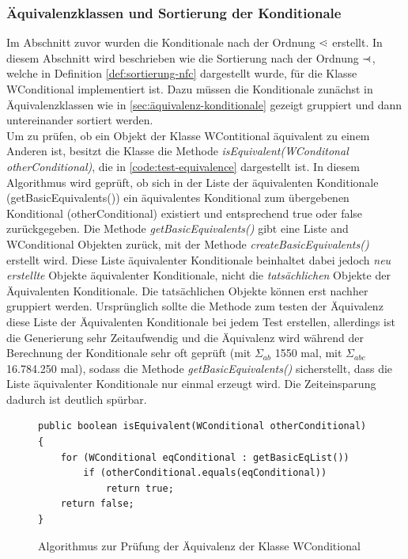 \documentclass[12pt,a4paper]{article}
\newcommand\dotl{\mathrel{%
    \mathchoice{\QEQ}{\QEQ}{\QEQ}{\QEQ}%
}}
\def\QEQ{{%
    \setbox0\hbox{<}%
    \rlap{\hbox to \wd0{\hss \raisebox {0.1pt}{$\ \cdot$\hss}}}\box0
}}
\newcommand\rdotl{\mathrel{%
    \mathchoice{\RQEQ}{\RQEQ}{\RQEQ}{\RQEQ}%
}}
\def\RQEQ{{%
    \setbox0\hbox{$\prec$}%
    \rlap{\hbox to \wd0{\hss \raisebox {0.01pt}{$\ \cdot$\hss}}}\box0
}}
\begin{document}
\subsubsection{Äquivalenzklassen und Sortierung der Konditionale}



Im Abschnitt zuvor wurden die Konditionale nach der Ordnung $\dotl$ erstellt. In diesem Abschnitt wird beschrieben wie die Sortierung nach der Ordnung $\rdotl$, welche in Definition \ref{def:sortierung-nfc} dargestellt wurde, für die Klasse WConditional implementiert ist. Dazu müssen die Konditionale zunächst in Äquivalenzklassen wie in \autoref{sec:äquivalenz-konditionale} gezeigt gruppiert und dann untereinander sortiert werden. \\
Um zu prüfen, ob ein Objekt der Klasse WContitional äquivalent zu einem Anderen ist, besitzt die Klasse die Methode \textit{isEquivalent(WConditonal otherConditional)}, die in \autoref{code:test-equivalence} dargestellt ist. In diesem Algorithmus wird geprüft, ob sich in der Liste der äquivalenten Konditionale (getBasicEquivalents()) ein äquivalentes Konditional zum übergebenen Konditional (otherConditional) existiert und entsprechend true oder false zurückgegeben. Die Methode \textit{getBasicEquivalents()} gibt eine Liste and WConditional Objekten zurück, mit der Methode \textit{createBasicEquivalents()} erstellt wird. Diese Liste äquivalenter Konditionale beinhaltet dabei jedoch \textit{neu erstellte} Objekte äquivalenter Konditionale, nicht die \textit{tatsächlichen} Objekte der Äquivalenten Konditionale. Die tatsächlichen Objekte können erst nachher gruppiert werden. Ursprünglich sollte die Methode zum testen der Äquivalenz diese Liste der Äquivalenten Konditionale bei jedem Test erstellen, allerdings ist die Generierung sehr Zeitaufwendig und die Äquivalenz wird während der Berechnung der Konditionale sehr oft geprüft (mit $\Sigma_{ab}$ 1550 mal, mit $\Sigma_{abc}$  16.784.250 mal), sodass die Methode \textit{getBasicEquivalents()} sicherstellt, dass die Liste äquivalenter Konditionale nur einmal erzeugt wird. Die Zeiteinsparung dadurch ist deutlich spürbar.


\begin{figure}
\begin{lstlisting}
public boolean isEquivalent(WConditional otherConditional) {
    for (WConditional eqConditional : getBasicEqList())
        if (otherConditional.equals(eqConditional))
            return true;
    return false;
}
\end{lstlisting}
\caption{Algorithmus zur Prüfung der Äquivalenz der Klasse WConditional}
\label{code:test-equivalence}
\end{figure} 
\end{document}
